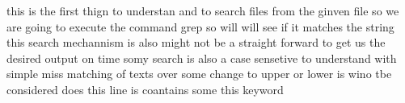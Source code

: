 this is the first thign to understan and to search files from the ginven file so we are going to execute the command grep so will will see if it matches the string
\n this search mechannism is also might not be a straight forward to get us the desired output on time so\n my search is also a case sensetive to understand with simple miss matching of texts over some change to upper or lower is wino tbe considered 
does this line is coantains some this keyword 
